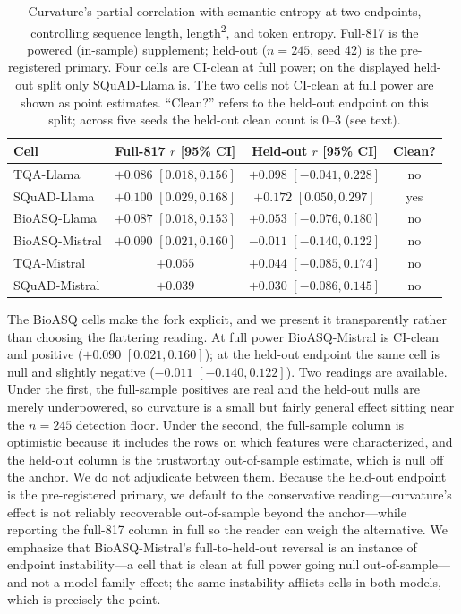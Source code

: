 \documentclass[11pt]{article}
\begin{document}
\begin{table}[t]
\centering
\caption{Curvature's partial correlation with semantic entropy at two endpoints, controlling sequence length, length\textsuperscript{2}, and token entropy. Full-817 is the powered (in-sample) supplement; held-out ($n=245$, seed 42) is the pre-registered primary. Four cells are CI-clean at full power; on the displayed held-out split only SQuAD-Llama is. The two cells not CI-clean at full power are shown as point estimates. ``Clean?'' refers to the held-out endpoint on this split; across five seeds the held-out clean count is 0--3 (see text).}
\label{tab:t2}
\begin{tabular}{lccc}
\toprule
Cell & Full-817 $r$ [95\% CI] & Held-out $r$ [95\% CI] & Clean? \\
\midrule
TQA-Llama & $+0.086$ $[0.018, 0.156]$ & $+0.098$ $[-0.041, 0.228]$ & no \\
SQuAD-Llama & $+0.100$ $[0.029, 0.168]$ & $+0.172$ $[0.050, 0.297]$ & yes \\
BioASQ-Llama & $+0.087$ $[0.018, 0.153]$ & $+0.053$ $[-0.076, 0.180]$ & no \\
BioASQ-Mistral & $+0.090$ $[0.021, 0.160]$ & $-0.011$ $[-0.140, 0.122]$ & no \\
TQA-Mistral & $+0.055$ & $+0.044$ $[-0.085, 0.174]$ & no \\
SQuAD-Mistral & $+0.039$ & $+0.030$ $[-0.086, 0.145]$ & no \\
\bottomrule
\end{tabular}
\end{table}
The BioASQ cells make the fork explicit, and we present it transparently rather than choosing the flattering reading. At full power BioASQ-Mistral is CI-clean and positive ($+0.090$ $[0.021, 0.160]$); at the held-out endpoint the same cell is null and slightly negative ($-0.011$ $[-0.140, 0.122]$). Two readings are available. Under the first, the full-sample positives are real and the held-out nulls are merely underpowered, so curvature is a small but fairly general effect sitting near the $n=245$ detection floor. Under the second, the full-sample column is optimistic because it includes the rows on which features were characterized, and the held-out column is the trustworthy out-of-sample estimate, which is null off the anchor. We do not adjudicate between them. Because the held-out endpoint is the pre-registered primary, we default to the conservative reading---curvature's effect is not reliably recoverable out-of-sample beyond the anchor---while reporting the full-817 column in full so the reader can weigh the alternative. We emphasize that BioASQ-Mistral's full-to-held-out reversal is an instance of endpoint instability---a cell that is clean at full power going null out-of-sample---and not a model-family effect; the same instability afflicts cells in both models, which is precisely the point.
\end{document}
